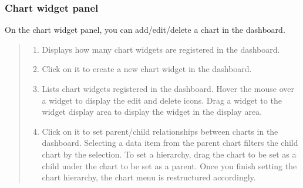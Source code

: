 \documentclass[letterpaper,10pt,english]{sphinxmanual}
\begin{document}
\subsubsection{Chart widget panel}
\label{\detokenize{discovery/part04/change_dashboard_layout_and_size:id3}}
On the chart widget panel, you can add/edit/delete a chart in the dashboard.
\begin{quote}

\begin{figure}[H]
\centering

\noindent{}
\end{figure}
\begin{enumerate}
\def\theenumi{\arabic{enumi}}
\def\labelenumi{\theenumi .}
\makeatletter\def\p@enumii{\p@enumi \theenumi .}\makeatother
\item {} 
 Displays how many chart widgets are registered in the dashboard.

\item {} 
 Click on it to create a new chart widget in the dashboard.

\item {} 
 Lists chart widgets registered in the dashboard. Hover the mouse over a widget to display the edit and delete icons. Drag a widget to the widget display area to display the widget in the display area.

\item {} 
 Click on it to set parent/child relationships between charts in the dashboard. Selecting a data item from the parent chart filters the child chart by the selection. To set a hierarchy, drag the chart to be set as a child under the chart to be set as a parent. Once you finish setting the chart hierarchy, the chart menu is restructured accordingly.

\end{enumerate}
\end{quote}
\end{document}
